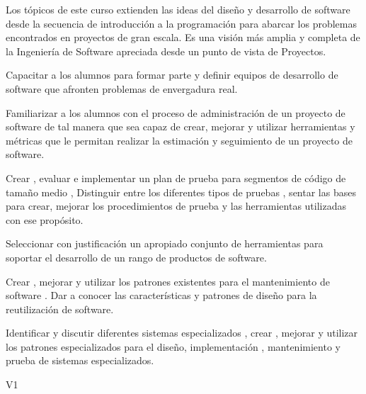 ﻿\begin{syllabus}


\begin{justification}
Los tópicos de este curso extienden las ideas del diseño y desarrollo de software desde la secuencia de introducción
a la programación para abarcar los problemas encontrados en proyectos de gran escala. Es una visión más amplia y
completa de la Ingenierí­a de Software apreciada desde un punto de vista de Proyectos.
\end{justification}

\begin{goals}
    \item Capacitar a los alumnos para formar parte y definir equipos de desarrollo de software que afronten problemas de envergadura real.
    \item Familiarizar a los alumnos con el proceso de administración de un proyecto de software de tal manera que sea capaz de crear, mejorar y utilizar herramientas y métricas que le permitan realizar la estimación y seguimiento de un proyecto de software.
    \item Crear , evaluar e implementar un plan de prueba para segmentos de código de tamaño medio , Distinguir entre los diferentes tipos de pruebas , sentar las bases para crear, mejorar los procedimientos de prueba y las herramientas utilizadas con ese propósito.
    \item Seleccionar con justificación un apropiado conjunto de herramientas para soportar el desarrollo de un rango de productos de software.
    \item Crear , mejorar y utilizar los patrones existentes para el mantenimiento de software . Dar a conocer las caracterí­sticas y patrones de diseño para la reutilización de software.
    \item Identificar y discutir diferentes sistemas especializados , crear , mejorar y utilizar los patrones especializados para el diseño, implementación , mantenimiento y prueba de sistemas especializados.
\end{goals}

\begin{outcomes}{V1}
    \item {}
    \item {}
	\item {}
	\item {}
	\item {}
\end{outcomes}


\end{syllabus}
